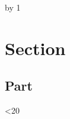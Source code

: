 \documentclass[10pt,a4paper]{article}
\begin{document}
\newcount\n {}
\loop\advance\n by 1
\section{Section \the\n}
\lipsum[1-7]
\subsection{Part \the\n}
\lipsum[8-12]
\ifnum\n<20\repeat
\end{document}
